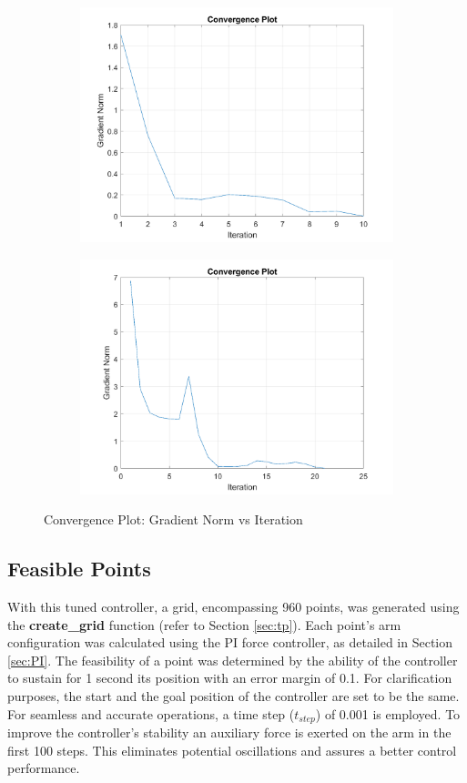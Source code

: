 \begin{figure}[h]
    \centering
    \begin{subfigure}[b]{0.45\textwidth}
        \centering
        \includegraphics[width=0.8\linewidth]{Pictures/Model/convergence.png}
    \end{subfigure}%
    \hfill
    \begin{subfigure}[b]{0.45\textwidth}
        \centering
        \includegraphics[width=0.8\linewidth]{Pictures/Model/convergence2.png}
    \end{subfigure}
    \caption{Convergence Plot: Gradient Norm vs Iteration}
\end{figure}
\subsection{Feasible Points}
With this tuned controller, a grid, encompassing 960 points, was generated using the \textbf{create\_grid} function (refer to Section \ref{sec:tp}). Each point's arm configuration was calculated using the PI force controller, as detailed in Section \ref{sec:PI}. The feasibility of a point was determined by the ability of the controller to sustain for 1 second its position with an error margin of 0.1. For clarification purposes, the start and the goal position of the controller are set to be the same. 
For seamless and accurate operations, a time step (\(t_{step}\)) of 0.001 is employed. To improve the controller's stability an auxiliary force is exerted on the arm in the first 100 steps. This eliminates potential oscillations and assures a better control performance.

